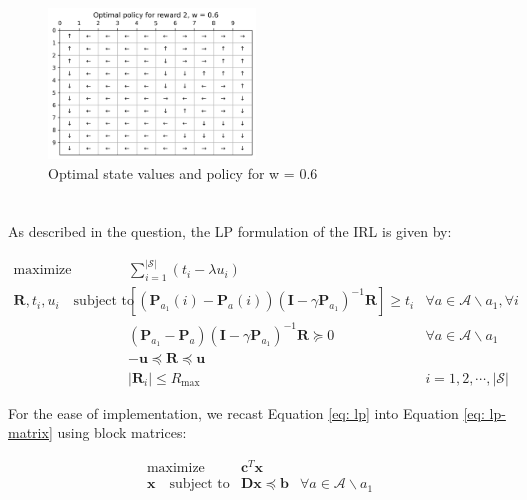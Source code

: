 \begin{figure}[!htb]
  \includegraphics[width=0.49\textwidth]{images/Q9/Optimal-policy-for-reward-2,-w-=-0.6.png}
  \caption{Optimal state values and policy for w = 0.6}
\label{fig: combo1}
\end{figure}
\clearpage

\section{}\label{sec:10}
As described in the question, the LP formulation of the IRL is given by:

\begin{equation}
\label{eq: lp}
    \begin{array}{rcl}
        \operatorname{maximize} & \sum_{i=1}^{|\mathcal{S}|}\left(t_{i}-\lambda u_{i}\right) & \\
        \mathbf{R}, t_{i}, u_{i} \quad \text{subject to} &
        \left[\left(\mathbf{P}_{a_{1}}(i)-\mathbf{P}_{a}(i)\right)\left(\mathbf{I}-\gamma \mathbf{P}_{a_{1}}\right)^{-1} \mathbf{R}\right] \geq t_{i} &
        \forall a \in \mathcal{A} \backslash a_{1}, \forall i \\ & \left(\mathbf{P}_{a_{1}}-\mathbf{P}_{a}\right)\left(\mathbf{I}-\gamma \mathbf{P}_{a_{1}}\right)^{-1} \mathbf{R} \succeq 0 &
        \forall a \in \mathcal{A} \backslash a_{1} \\ &
        -\mathbf{u} \preceq \mathbf{R} \preceq \mathbf{u} \\ & \left|\mathbf{R}_{i}\right| \leq R_{\max } &
        i=1,2,\cdots,|\mathcal{S}|
    \end{array}
\end{equation}

For the ease of implementation, we recast Equation \ref{eq: lp} into Equation \ref{eq: lp-matrix} using block matrices:

\begin{equation}
\label{eq: lp-matrix}
    \begin{array}{rcl}
        \operatorname{maximize} & \mathbf{c}^{T} \mathbf{x} & \\
        \mathbf{x} \quad \text{subject to} &
        \mathbf{D x} \preceq \mathbf{b} &
        \forall a \in \mathcal{A} \backslash a_{1}
    \end{array}
\end{equation}

